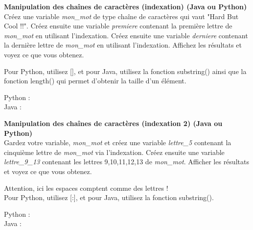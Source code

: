 \begin{Exercice}[20 minutes] \textbf{Manipulation des chaînes de caractères (indexation) (Java ou Python)}\\
   Créez une variable \textit{mon\_mot} de type chaîne de caractères qui vaut "Hard But Cool !!". Créez ensuite une variable \textit{premiere} contenant la première lettre de \textit{mon\_mot} en utilisant l'indexation. Créez ensuite une variable \textit{derniere} contenant la dernière lettre de \textit{mon\_mot} en utilisant l'indexation. Affichez les résultats et voyez ce que vous obtenez. \\
   
    \begin{conseil}
      	Pour Python, utilisez [], et pour Java, utilisez la fonction substring() ainsi que la fonction length() qui permet d'obtenir la taille d'un élément.
        
    \end{conseil}
    \begin{solution}
    
    Python : \\
    
    
    
    Java : \\
    
    
           
    \end{solution}   
\end{Exercice}

\begin{Exercice}[20 minutes] \textbf{Manipulation des chaînes de caractères (indexation 2) (Java ou Python)}\\
   Gardez votre variable, \textit{mon\_mot} et créez une variable \textit{lettre\_5} contenant la cinquième lettre de \textit{mon\_mot} via l'indexation. Créez ensuite une variable \textit{lettre\_9\_13} contenant les lettres 9,10,11,12,13 de \textit{mon\_mot}. Afficher les résultats et voyez ce que vous obtenez.  \\
   
    \begin{conseil}
      	Attention, ici les espaces comptent comme des lettres ! \\

		Pour Python, utilisez [:], et pour Java, utilisez la fonction substring().
        
    \end{conseil}
    \begin{solution}
    
    Python : \\
    
    
    
    Java : \\
    
    
           
    \end{solution}   
\end{Exercice}


